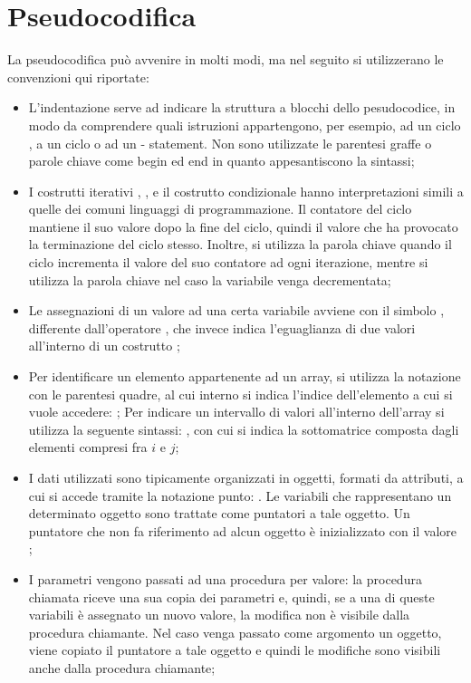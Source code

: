 \section{Pseudocodifica}
La pseudocodifica può avvenire in molti modi, ma nel seguito si utilizzerano le convenzioni qui riportate:
\begin{itemize}
  \item L'indentazione serve ad indicare la struttura a blocchi dello pesudocodice, in modo da comprendere quali istruzioni appartengono, per esempio, ad un ciclo , a un ciclo  o ad un - statement. Non sono utilizzate le parentesi graffe o parole chiave come begin ed end in quanto appesantiscono la sintassi;
  \item I costrutti iterativi , ,  e il costrutto condizionale  hanno interpretazioni simili a quelle dei comuni linguaggi di programmazione. Il contatore del ciclo mantiene il suo valore dopo la fine del ciclo, quindi il valore che ha provocato la terminazione del ciclo stesso. Inoltre, si utilizza la parola chiave  quando il ciclo  incrementa il valore del suo contatore ad ogni iterazione, mentre si utilizza la parola chiave  nel caso la variabile venga decrementata;
  \item Le assegnazioni di un valore ad una certa variabile avviene con il simbolo \code{:=}, differente dall'operatore \code{=}, che invece indica l'eguaglianza di due valori all'interno di un costrutto ;
  \item Per identificare un elemento appartenente ad un array, si utilizza la notazione con le parentesi quadre, al cui interno si indica l'indice dell'elemento a cui si vuole accedere: ; Per indicare un intervallo di valori all'interno dell'array si utilizza la seguente sintassi: , con cui si indica la sottomatrice composta dagli elementi compresi fra \(i\) e \(j\); 
  \item I dati utilizzati sono tipicamente organizzati in oggetti, formati da attributi, a cui si accede tramite la notazione punto: . Le variabili che rappresentano un determinato oggetto sono trattate come puntatori a tale oggetto. Un puntatore che non fa riferimento ad alcun oggetto è inizializzato con il valore ;
  \item I parametri vengono passati ad una procedura per valore: la procedura chiamata riceve una sua copia dei parametri e, quindi, se a una di queste variabili è assegnato un nuovo valore, la modifica non è visibile dalla procedura chiamante. Nel caso venga passato come argomento un oggetto, viene copiato il puntatore a tale oggetto e quindi le modifiche sono visibili anche dalla procedura chiamante;

\end{itemize}

